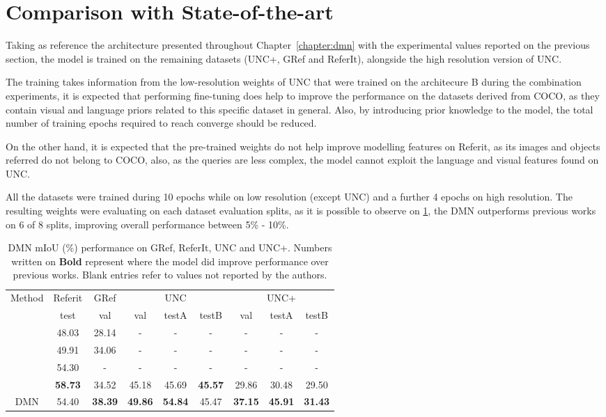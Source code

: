 \section{Comparison with State-of-the-art}
Taking as reference the architecture presented throughout Chapter~\ref{chapter:dmn} with the experimental values reported on the previous section, the model is trained on the remaining datasets (UNC+, GRef and ReferIt), alongside the high resolution version of UNC. 

The training takes information from the low-resolution weights of UNC that were trained on the architecure B during the combination experiments, it is expected that performing  fine-tuning does help to improve the performance on the datasets derived from COCO, as they contain visual and language priors related to this specific dataset in general. Also, by introducing prior knowledge to the model, the total number of training epochs required to reach converge should be reduced. 

On the other hand, it is expected that the pre-trained weights do not help improve modelling features on Referit, as its images and objects referred do not belong to COCO, also, as the queries are less complex, the model cannot exploit the language and visual features found on UNC.

All the datasets were trained during 10 epochs while on low resolution (except UNC) and a further 4 epochs on high resolution. The resulting weights were evaluating on each dataset evaluation splits, as it is possible to observe on \ref{Tab:soa-results}, the DMN outperforms previous works on 6 of 8 splits, improving overall performance between 5\% - 10\%.

\begin{table}[!htbp]
    \centering
    \begin{tabular}{ c | c | c | c | c | c | c | c | c }
\hline
Method 	&\multicolumn{1}{c|}{Referit} 		& \multicolumn{1}{c|}{GRef} & \multicolumn{3}{c|}{UNC} 			& \multicolumn{3}{c}{UNC+} 		\\
							& test 			& val 						& val		& testA 	& testB 	& val 		& testA 	& testB 	\\
\hline
\cite{hu2016segmentation} 	& 48.03 		& 28.14						& - 		& -			& -			& -			& -			& - 		\\
\cite{Hu2016} 				& 49.91      	& 34.06						& - 		& -			& -			& -			& -			& - 		\\
\cite{li2017cvpr} 			& 54.30      	& - 						& - 		& -			& -			& -			& -			& - 		\\
\cite{liu2017segmentation}	&\textbf{58.73}		& 34.52 					& 45.18		& 45.69 	&\textbf{45.57} & 29.86		& 30.48 	& 29.50 	\\
\hline
DMN						& 54.40	 		& \textbf{38.39} 				&\textbf{49.86}	& \textbf{54.84}& 45.47  	&\textbf{37.15}	&\textbf{45.91}	& \textbf{31.43} \\
\hline  
\end{tabular}
    \caption{DMN mIoU (\%) performance on GRef, ReferIt, UNC and UNC+. Numbers written on \textbf{Bold} represent where the model did improve performance over previous works. Blank entries refer to values not reported by the authors.}
    \label{Tab:soa-results}
\end{table}

